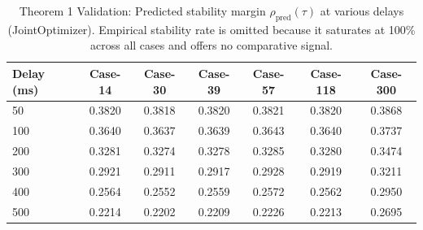 \begin{table}[t]
\centering
\caption{Theorem 1 Validation: Predicted stability margin $\rho_{\mathrm{pred}}(\tau)$ at various delays (JointOptimizer). Empirical stability rate is omitted because it saturates at 100\% across all cases and offers no comparative signal.}
\label{tab:theorem1}
\begin{tabular}{lcccccc}
\toprule
Delay (ms) & Case-14 & Case-30 & Case-39 & Case-57 & Case-118 & Case-300 \\
\midrule
50 & 0.3820 & 0.3818 & 0.3820 & 0.3821 & 0.3820 & 0.3868 \\
100 & 0.3640 & 0.3637 & 0.3639 & 0.3643 & 0.3640 & 0.3737 \\
200 & 0.3281 & 0.3274 & 0.3278 & 0.3285 & 0.3280 & 0.3474 \\
300 & 0.2921 & 0.2911 & 0.2917 & 0.2928 & 0.2919 & 0.3211 \\
400 & 0.2564 & 0.2552 & 0.2559 & 0.2572 & 0.2562 & 0.2950 \\
500 & 0.2214 & 0.2202 & 0.2209 & 0.2226 & 0.2213 & 0.2695 \\
\bottomrule
\end{tabular}
\end{table}